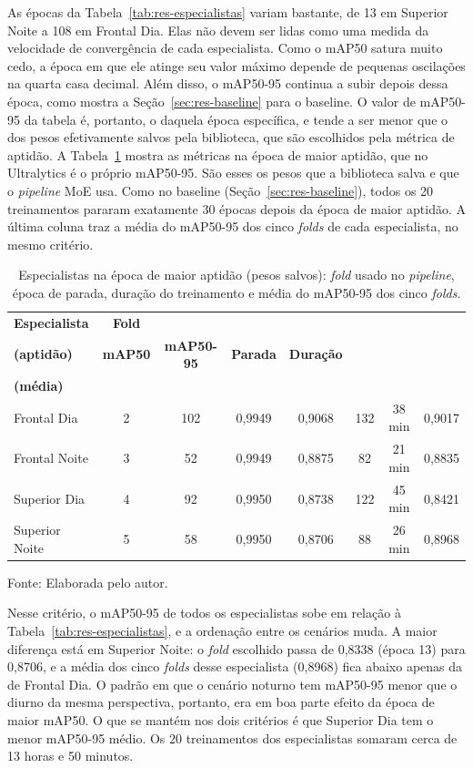 As épocas da Tabela~\ref{tab:res-especialistas} variam bastante, de 13 em Superior Noite a 108 em Frontal Dia. Elas não devem ser lidas como uma medida da velocidade de convergência de cada especialista. Como o mAP50 satura muito cedo, a época em que ele atinge seu valor máximo depende de pequenas oscilações na quarta casa decimal. Além disso, o mAP50-95 continua a subir depois dessa época, como mostra a Seção~\ref{sec:res-baseline} para o baseline. O valor de mAP50-95 da tabela é, portanto, o daquela época específica, e tende a ser menor que o dos pesos efetivamente salvos pela biblioteca, que são escolhidos pela métrica de aptidão. A Tabela~\ref{tab:res-especialistas-aptidao} mostra as métricas na época de maior aptidão, que no Ultralytics é o próprio mAP50-95. São esses os pesos que a biblioteca salva e que o \textit{pipeline} MoE usa. Como no baseline (Seção~\ref{sec:res-baseline}), todos os 20 treinamentos pararam exatamente 30 épocas depois da época de maior aptidão. A última coluna traz a média do mAP50-95 dos cinco \textit{folds} de cada especialista, no mesmo critério.

\begin{table}[htb]
\centering
\caption{Especialistas na época de maior aptidão (pesos salvos): \textit{fold} usado no \textit{pipeline}, época de parada, duração do treinamento e média do mAP50-95 dos cinco \textit{folds}.}
\label{tab:res-especialistas-aptidao}
\footnotesize
\begin{tabular}{lccccccc}
\hline
\textbf{Especialista} & \textbf{Fold} & \shortstack{\textbf{Época}\\\textbf{(aptidão)}} & \textbf{mAP50} & \textbf{mAP50-95} & \textbf{Parada} & \textbf{Duração} & \shortstack{\textbf{mAP50-95}\\\textbf{(média)}} \\
\hline
Frontal Dia & 2 & 102 & 0,9949 & 0,9068 & 132 & 38 min & 0,9017 \\
Frontal Noite & 3 & 52 & 0,9949 & 0,8875 & 82 & 21 min & 0,8835 \\
Superior Dia & 4 & 92 & 0,9950 & 0,8738 & 122 & 45 min & 0,8421 \\
Superior Noite & 5 & 58 & 0,9950 & 0,8706 & 88 & 26 min & 0,8968 \\
\hline
\end{tabular}

\vspace{0.2cm}
\normalsize
Fonte: Elaborada pelo autor.
\end{table}

Nesse critério, o mAP50-95 de todos os especialistas sobe em relação à Tabela~\ref{tab:res-especialistas}, e a ordenação entre os cenários muda. A maior diferença está em Superior Noite: o \textit{fold} escolhido passa de 0,8338 (época 13) para 0,8706, e a média dos cinco \textit{folds} desse especialista (0,8968) fica abaixo apenas da de Frontal Dia. O padrão em que o cenário noturno tem mAP50-95 menor que o diurno da mesma perspectiva, portanto, era em boa parte efeito da época de maior mAP50. O que se mantém nos dois critérios é que Superior Dia tem o menor mAP50-95 médio. Os 20 treinamentos dos especialistas somaram cerca de 13 horas e 50 minutos.

